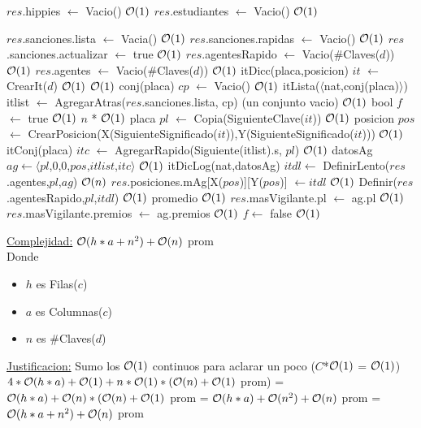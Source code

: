 \begin{Algoritmos}
\begin{algorithm}[H]
\begin{algorithmic}[1]
	\State $res$.hippies $\gets$ Vacio() \Comment $\mathcal{O}(1)$
	\State $res$.estudiantes $\gets$ Vacio() \Comment $\mathcal{O}(1)$
	
	\State $res$.sanciones.lista $\gets$ Vacia() \Comment $\mathcal{O}(1)$
	\State $res$.sanciones.rapidas $\gets$ Vacio() \Comment $\mathcal{O}(1)$
	\State $res$.sanciones.actualizar $\gets$ true \Comment $\mathcal{O}(1)$
	\State $res$.agentesRapido $\gets$ Vacio($\#$Claves($d$)) \Comment $\mathcal{O}(1)$
	\State $res$.agentes $\gets$ Vacio($\#$Claves($d$)) \Comment $\mathcal{O}(1)$ %
	\State itDicc(placa,posicion) $it$ $\gets$ CrearIt($d$) \Comment $\mathcal{O}(1)$
	 \Comment $\mathcal{O}(1)$
		\State conj(placa) $cp$ $\gets$ Vacio() \Comment $\mathcal{O}(1)$
		\State itLista($\langle$nat,conj(placa)$\rangle$) itlist $\gets$ AgregarAtras($res$.sanciones.lista, cp) \Comment (un conjunto vacio) $\mathcal{O}(1)$
		\State bool $f$ $\gets$ true \Comment $\mathcal{O}(1)$
		 \Comment $n$ * $\mathcal{O}(1)$
	 	\State placa $pl$ $\gets$ Copia(SiguienteClave($it$)) \Comment $\mathcal{O}(1)$
	 	\State posicion $pos$ $\gets$ CrearPosicion(X(SiguienteSignificado($it$)),Y(SiguienteSignificado($it$))) \Comment $\mathcal{O}(1)$
	 	\State itConj(placa) $itc$ $\gets$ AgregarRapido(Siguiente(itlist).s, $pl$) \Comment $\mathcal{O}(1)$
	 	\State datosAg $ag \gets \langle pl$,0,0,$pos$,$itlist$,$itc \rangle$ \Comment $\mathcal{O}(1)$
	 	\State itDicLog(nat,datosAg) $itdl \gets$ DefinirLento($res$.agentes,$pl$,$ag$) \Comment $\mathcal{O}(n)$
	 	\State $res$.posiciones.mAg[X($pos$)][Y($pos$)] $\gets itdl$ \Comment $\mathcal{O}(1)$
	 	\State Definir($res$.agentesRapido,$pl$,$itdl$) \Comment $\mathcal{O}(1)$ promedio
	 	 \Comment $\mathcal{O}(1)$
	 		\State $res$.masVigilante.pl $\gets$ ag.pl \Comment $\mathcal{O}(1)$
	 		\State $res$.masVigilante.premios $\gets$ ag.premios \Comment $\mathcal{O}(1)$
	 		\State $f \gets$ false \Comment $\mathcal{O}(1)$
	 	\EndIf
	 \EndWhile
	 \EndIf
\EndProcedure
\end{algorithmic}

\underline{Complejidad:} $\mathcal{O}(h*a + n^2) + \mathcal{O}(n)$ prom\\
Donde 
\begin{itemize}
	\item $h$ es Filas($c$)
	\item $a$ es Columnas($c$)
	\item $n$ es $\#$Claves($d$)
\end{itemize}	
\underline{Justificacion:} Sumo los $\mathcal{O}(1)$ continuos para aclarar un poco ($C$*$\mathcal{O}(1)$ = $\mathcal{O}(1)$)\\
$4*\mathcal{O}(h*a) + \mathcal{O}(1) + n * \mathcal{O}(1) * (\mathcal{O}(n) + \mathcal{O}(1)$ prom) = $\mathcal{O}(h*a) + \mathcal{O}(n)*(\mathcal{O}(n) + \mathcal{O}(1)$ prom = $\mathcal{O}(h*a) + \mathcal{O}(n^2) + \mathcal{O}(n)$ prom = $\mathcal{O}(h*a + n^2) + \mathcal{O}(n)$ prom
\end{algorithm}



\end{Algoritmos}
